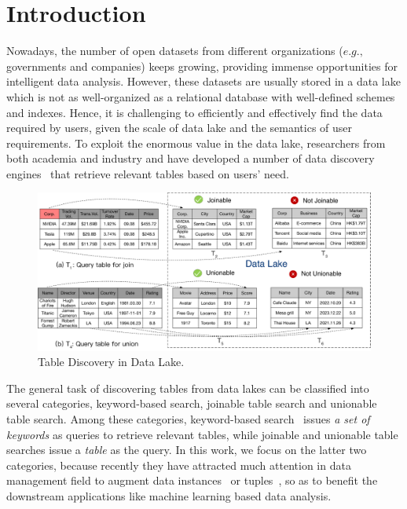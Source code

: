 \section{Introduction}

Nowadays, the number of open datasets from different organizations ($e.g.,$ governments and companies) keeps growing, providing immense opportunities for intelligent data analysis. However, these datasets are usually stored in a data lake which is not as well-organized as a relational database with well-defined schemes and indexes. Hence, it is challenging to efficiently and effectively find the data required by users, given the scale of data lake and the semantics of user requirements.  
To exploit the enormous value in the data lake, researchers from both academia and industry and have developed a number of data discovery engines~\cite{} that retrieve relevant tables based on users' need. 

\begin{figure}[h]
	\centering
	\includegraphics[width=0.8\linewidth]{fig/example.pdf}
	\caption{Table Discovery in Data Lake.}
	\label{fig:example}
\end{figure}



The general task of discovering tables from data lakes can be classified into several categories, \eg keyword-based search, joinable table search and unionable table search. Among these categories, keyword-based search~\cite{} issues {\it a set of keywords} as queries to retrieve relevant tables, while joinable and unionable table searches issue a {\it table} as the query.
In this work, we focus on the latter two categories, because recently they have attracted much attention in data management field to augment data instances~\cite{} or tuples~\cite{}, so as to  benefit the downstream applications like machine learning based data analysis. 
%

